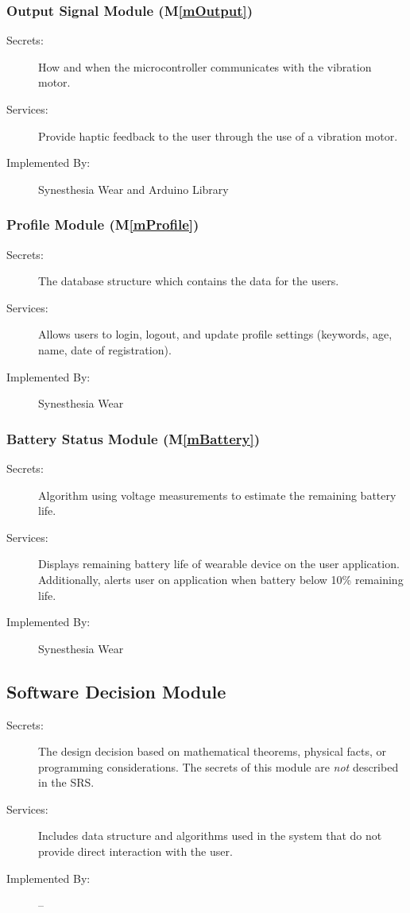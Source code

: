 \documentclass[12pt, titlepage]{article}
\newcommand{\mref}[1]{M\ref{#1}}
\begin{document}
\subsubsection{Output Signal Module (\mref{mOutput})}
\begin{description}
  \item[Secrets:] How and when the microcontroller communicates with the vibration motor.
  \item[Services:] Provide haptic feedback to the user through the use of a vibration motor.
  \item[Implemented By:] Synesthesia Wear and Arduino Library
  \end{description}

\subsubsection{Profile Module (\mref{mProfile})}
\begin{description}
  \item[Secrets:] The database structure which contains the data for the users.
  \item[Services:] Allows users to login, logout, and update profile settings (keywords, age, name, date of registration).
  \item[Implemented By:] Synesthesia Wear
  \end{description}

\subsubsection{Battery Status Module (\mref{mBattery})}
\begin{description}
  \item[Secrets:] Algorithm using voltage measurements to estimate the remaining battery life.
  \item[Services:] Displays remaining battery life of wearable device on the user application. Additionally, alerts user on application when battery below 10\% remaining life.
  \item[Implemented By:] Synesthesia Wear
  \end{description}


\subsection{Software Decision Module}

\begin{description}
\item[Secrets:] The design decision based on mathematical theorems, physical
  facts, or programming considerations. The secrets of this module are
  \emph{not} described in the SRS.
\item[Services:] Includes data structure and algorithms used in the system that
  do not provide direct interaction with the user. 
\item[Implemented By:] --
\end{description}
\end{document}
